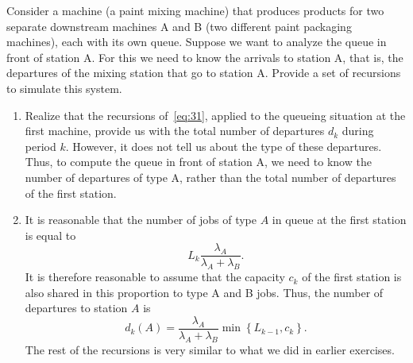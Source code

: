 \begin{extra}
 Consider a machine (a paint mixing machine) that produces products for two separate downstream machines A and B (two different paint packaging machines), each with its own queue.
 Suppose we want to analyze the queue in front of station A.
 For this we need to know the arrivals to station A, that is, the departures of the mixing station that go to station A.
 Provide a set of recursions to simulate this system.
\begin{solution}
\begin{enumerate}
\item Realize that the recursions of~\cref{eq:31}, applied to the queueing situation at the first machine, provide us with the total number of departures $d_k$ during period $k$.
 However, it does not tell us about the type of these departures.
 Thus, to compute the queue in front of station A, we need to know the number of departures of type A, rather than the total number of departures of the first station.
\item It is reasonable that the number of jobs of type $A$ in queue at
 the first station is equal to
 \begin{equation*}
 L_k \frac{\lambda_A}{\lambda_A + \lambda_B}.
 \end{equation*}
 It is therefore reasonable to assume that the capacity $c_k$ of the
 first station is also shared in this proportion to type A and B
 jobs. Thus, the number of departures to station $A$ is
 \begin{equation*}
 d_k(A) = \frac{\lambda_A}{\lambda_A+\lambda_B} \min\left\{ L_{k-1}, c_k\right\}.
 \end{equation*}
 The rest of the recursions is very similar to what we did in earlier exercises.
\end{enumerate}
\end{solution}
\end{extra}




